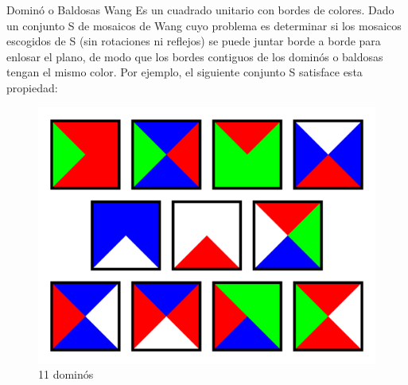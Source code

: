 \documentclass[11pt]{beamer}
\begin{document}
		 \begin{frame}{ Dominó o Baldosas Wang}
			\justifying
			Es un cuadrado unitario con bordes de colores. Dado un conjunto S de mosaicos de Wang \cite{Culik1996} cuyo problema es determinar si los mosaicos escogidos de S (sin rotaciones ni reflejos) se puede juntar borde a borde para enlosar el plano, de modo que los bordes contiguos de los dominós o baldosas tengan el mismo color. Por ejemplo, el siguiente conjunto S satisface esta propiedad:
			
			\begin{figure}[H]
				\centering
				\includegraphics[scale=0.15]{img/Wang11.png}
				\caption{11 dominós}
				\label{fig: wang11}
			\end{figure}
			
		 \end{frame}
		 
\end{document}
